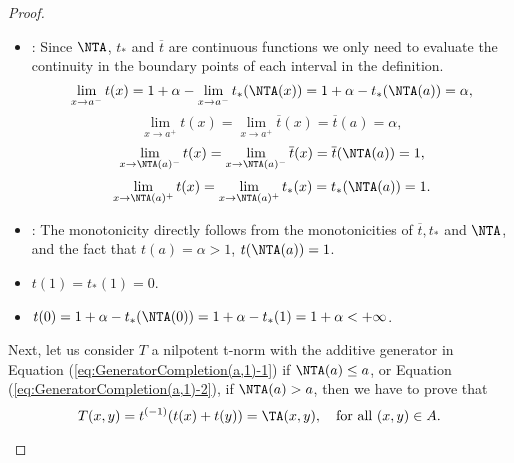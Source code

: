 \begin{proof}
\begin{description}
		\begin{itemize}
			\item \underline{}: Since $\NTA$, $t_*$ and $\overline{t}$ are continuous functions we only need to evaluate the continuity in the boundary points of each interval in the definition.
			$$ \lim_{x \to a^{-}} t(x)= 1 + \alpha - \lim_{x \to a^{-}} t_*(\NTA(x)) = 1 + \alpha - t_*(\NTA(a))=\alpha,$$
			$$
			\lim_{x \to a^+} t(x) = \lim_{x \to a^+} \overline{t}(x)= \overline{t}(a)=\alpha,
			$$
			$$ \lim_{x \to \NTA(a)^-} t(x) = \lim_{x \to \NTA(a)^-} \overline{t}(x) =  \overline{t}(\NTA(a))=1,
			$$
			$$
			\lim_{x \to \NTA(a)^+} t(x) = \lim_{x \to \NTA(a)^+} t_*(x) =  t_*(\NTA(a))=1.
			$$
			\item \underline{}: The monotonicity directly  follows from the monotonicities of $\overline{t}, t_*$ and $\NTA$, and the fact that $t(a)=\alpha>1$, $t(\NTA(a))=1$.
			\item $t(1)= t_*(1)=0$.
			\item $t(0)=1+\alpha-t_*(\NTA(0))=1+\alpha -t_*(1)=1+\alpha < +\infty$.
		\end{itemize}
		Next, let us consider $T$ a nilpotent t-norm with the additive generator in Equation (\ref{eq:GeneratorCompletion(a,1)-1}) if $\NTA(a) \leq a$, or Equation (\ref{eq:GeneratorCompletion(a,1)-2}), if $\NTA(a)>a$, then we have to prove that
		$$T(x,y)=t^{(-1)}(t(x)+t(y)) = \TA(x,y), \quad \text{for all } (x,y) \in A.$$
		

\end{description}
\end{proof}

